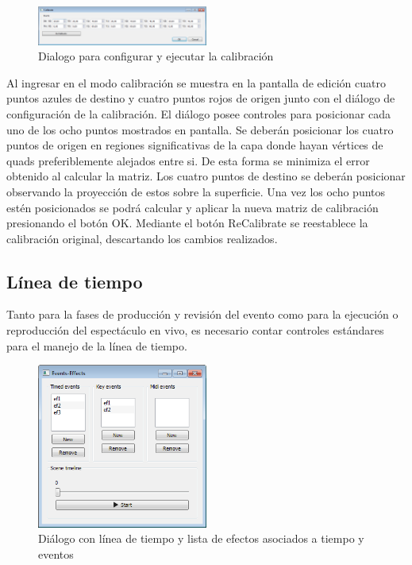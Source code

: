 \begin{figure}[H]
  \centering
    \includegraphics[width=0.5\textwidth]{./Cap5_vmt/vmt_Calibrate.png}
  \caption{Dialogo para configurar y ejecutar la calibración}
  \label{fig:VMT-Calib}
\end{figure}

Al ingresar en el modo calibración se muestra en la pantalla de edición cuatro puntos azules de destino y cuatro puntos rojos de origen junto con el diálogo de configuración de la calibración.
El diálogo posee controles para posicionar cada uno de los ocho puntos mostrados en pantalla. Se deberán posicionar los cuatro puntos de origen en regiones significativas de la capa donde hayan vértices de quads preferiblemente alejados entre si. De esta forma se minimiza el error obtenido al calcular la matriz.
Los cuatro puntos de destino se deberán posicionar observando la proyección de estos sobre la superficie. Una vez los ocho puntos estén posicionados se podrá calcular y aplicar la nueva matriz de calibración presionando el botón OK.
Mediante el botón ReCalibrate se reestablece la calibración original, descartando los cambios realizados.

\subsection{Línea de tiempo}

Tanto para la fases de producción y revisión del evento como para la ejecución o reproducción del espectáculo en vivo, es necesario contar controles estándares para el manejo de la línea de tiempo.

\begin{figure}[H]
  \centering
    \includegraphics[width=0.5\textwidth]{./Cap5_vmt/vmt_events_effects.png}
  \caption{Diálogo con línea de tiempo y lista de efectos asociados a tiempo y eventos}
  \label{fig:VMT-Timeline}
\end{figure}


